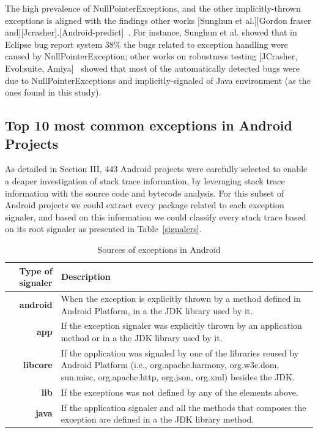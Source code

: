 \documentclass[conference]{IEEEtran}
\begin{document}
The high prevalence of NullPointerExceptions, and the other implicitly-thrown exceptions  is aligned with the findings other works [Sunghun et al.][Gordon fraser and][Jcrasher].[Android-predict]~. For instance, Sunghun et al. showed that in Eclipse bug report system 38\% the bugs related to exception handling were caused by NullPointerException; other works on robustness testing [JCrasher, Evol;suite, Amiya]~ showed that most of the automatically detected bugs were due to NullPointerExceptions and implicitly-signaled of Java environment (as the ones found in this study).


\subsection{Top 10 most common exceptions in Android Projects}

As detailed in Section III, 443 Android projects were carefully selected to enable a deaper investigation of stack trace information, by leveraging stack trace information with the source code and bytecode analysis. For this subset of Android projects we could extract every package related to each exception signaler, and based on this information we could classify every stack trace based on its root signaler as presented in Table~\ref{signalers}.

\begin{table}
  \centering
  \begin{tabular}{rp{22em}}
    \hline
    \bfseries{Type of signaler} & \bfseries{Description} \\
    \hline
    \bfseries{android} & When the exception is explicitly thrown by a method defined in Android Platform, in a the JDK library used by it.\\
    \bfseries{app} &	If the exception signaler was explicitly thrown by an application method or in a the JDK library used by it.\\
    \bfseries{libcore} &	If the application was signaled by one of the libraries reused by Android Platform (i.e., org.apache.harmony, org.w3c.dom, sun.misc, org.apache.http, org.json, org.xml) besides the JDK. \\
    \bfseries{lib} &	If the exceptions was not defined by any of the elements above.\\
    \bfseries{java} &	If the application signaler and all the methods that composes the exception are defined in a the JDK library method.\\
    \hline
  \end{tabular}
  \caption{Sources of exceptions in Android}
  \label{tab:signalers}
\end{table}
\end{document}
